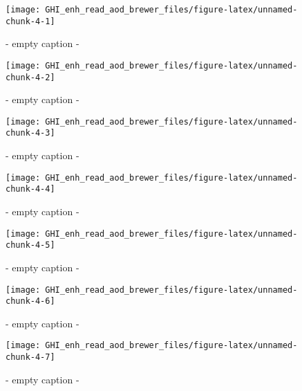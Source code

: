 \documentclass[
  10pt,
  a4paper,oneside]{article}
\begin{document}
\begin{figure}[H]

{\centering \texttt{[image: GHI\_enh\_read\_aod\_brewer\_files/figure-latex/unnamed-chunk-4-1]} 

}

\caption{ - empty caption - }\label{fig:unnamed-chunk-4-1}
\end{figure}
\begin{figure}[H]

{\centering \texttt{[image: GHI\_enh\_read\_aod\_brewer\_files/figure-latex/unnamed-chunk-4-2]} 

}

\caption{ - empty caption - }\label{fig:unnamed-chunk-4-2}
\end{figure}
\begin{figure}[H]

{\centering \texttt{[image: GHI\_enh\_read\_aod\_brewer\_files/figure-latex/unnamed-chunk-4-3]} 

}

\caption{ - empty caption - }\label{fig:unnamed-chunk-4-3}
\end{figure}
\begin{figure}[H]

{\centering \texttt{[image: GHI\_enh\_read\_aod\_brewer\_files/figure-latex/unnamed-chunk-4-4]} 

}

\caption{ - empty caption - }\label{fig:unnamed-chunk-4-4}
\end{figure}
\begin{figure}[H]

{\centering \texttt{[image: GHI\_enh\_read\_aod\_brewer\_files/figure-latex/unnamed-chunk-4-5]} 

}

\caption{ - empty caption - }\label{fig:unnamed-chunk-4-5}
\end{figure}
\begin{figure}[H]

{\centering \texttt{[image: GHI\_enh\_read\_aod\_brewer\_files/figure-latex/unnamed-chunk-4-6]} 

}

\caption{ - empty caption - }\label{fig:unnamed-chunk-4-6}
\end{figure}
\begin{figure}[H]

{\centering \texttt{[image: GHI\_enh\_read\_aod\_brewer\_files/figure-latex/unnamed-chunk-4-7]} 

}

\caption{ - empty caption - }\label{fig:unnamed-chunk-4-7}
\end{figure}
\end{document}

